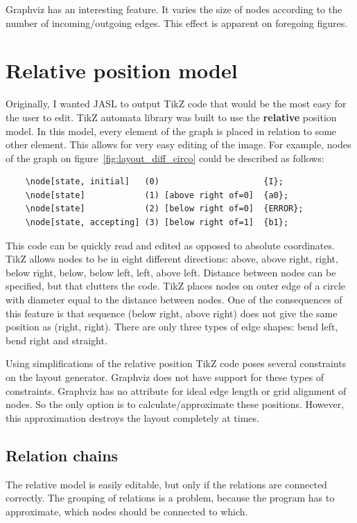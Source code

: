 \documentclass{ctuthesis}
\begin{document}
Graphviz has an interesting feature. It varies the size of nodes according to the number of incoming/outgoing edges. This effect is apparent on foregoing figures.

\section{Relative position model}
\label{sec:relpos}
Originally, I wanted JASL to output TikZ code that would be the most easy for the user to edit. TikZ automata library was built to use the \textbf{relative} position model. In this model, every element of the graph is placed in relation to some other element. This allows for very easy editing of the image. For example, nodes of the graph on figure~\ref{fig:layout_diff_circo} could be described as follows:

\begin{verbatim}
	\node[state, initial] 	(0) 					{I};
	\node[state] 			(1) [above right of=0] 	{a0};
	\node[state] 			(2) [below right of=0] 	{ERROR};
	\node[state, accepting] (3) [below right of=1] 	{b1};
\end{verbatim}

This code can be quickly read and edited as opposed to absolute coordinates. TikZ allows nodes to be in eight different directions: above, above right, right, below right, below, below left, left, above left. Distance between nodes can be specified, but that clutters the code. TikZ places nodes on outer edge of a circle with diameter equal to the distance between nodes. One of the consequences of this feature is that sequence (below right, above right) does not give the same position as (right, right). There are only three types of edge shapes: bend left, bend right and straight. 

Using simplifications of the relative position TikZ code poses several constraints on the layout generator. Graphviz does not have support for these types of constraints. Graphviz has no attribute for ideal edge length or grid alignment of nodes. So the only option is to calculate/approximate these positions. However, this approximation destroys the layout completely at times. 

\subsection{Relation chains}
The relative model is easily editable, but only if the relations are connected correctly. The grouping of relations is a problem, because the program has to approximate, which nodes should be connected to which.
\end{document}
